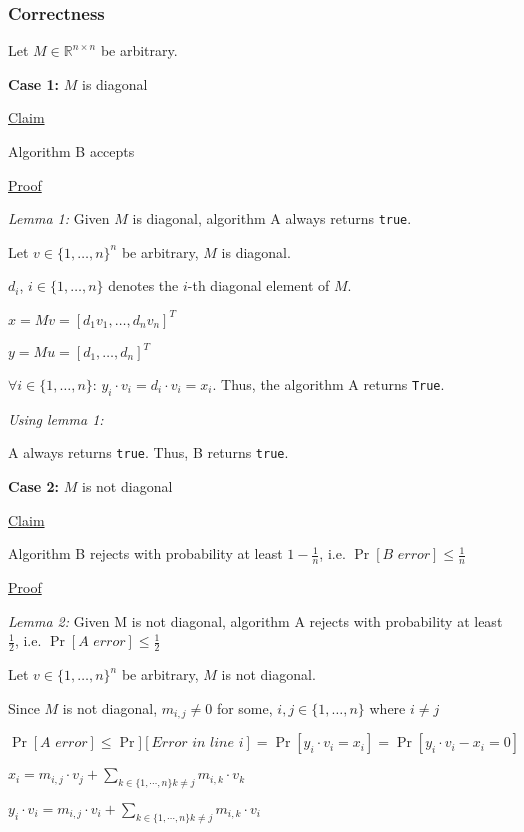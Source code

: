 \subsubsection*{Correctness}

Let $M  \in \mathbb{R}^{n \times n}$ be arbitrary.

\textbf{Case 1:} $M$ is diagonal

\underline{Claim} 

Algorithm B accepts

\underline{Proof}

\textit{Lemma 1:} Given $M$ is diagonal, algorithm A always returns \texttt{true}.

Let $v \in \{1,\dots,n\}^n$ be arbitrary, $M$ is diagonal.

$d_i$, $i \in \{1,\dots,n\}$ denotes the $i$-th diagonal element of $M$.

$x = Mv = [d_1 v_1,\dots, d_n v_n]^T$

$y = Mu = [d_1,\dots,d_n]^T$

$\forall i \in \{1,\dots,n\}$: $y_i \cdot v_i = d_i \cdot v_i = x_i$. Thus, the algorithm A returns \texttt{True}.

\textit{Using lemma 1:}

A always returns \texttt{true}. Thus, B returns \texttt{true}.

\textbf{Case 2:} $M$ is not diagonal

\underline{Claim} 

Algorithm B rejects with probability at least $1 - \frac{1}{n}$, i.e. $\operatorname{Pr}[\textit{B error}] \leq \frac{1}{n}$

\underline{Proof}

\textit{Lemma 2:} Given M is not diagonal, algorithm A rejects with probability at least $\frac{1}{2}$, i.e. $\operatorname{Pr}[\textit{A error}] \leq \frac{1}{2}$

Let $v \in \{1,\dots,n\}^n$ be arbitrary, $M$ is not diagonal.

Since $M$ is not diagonal, $m_{i,j} \neq 0$ for some, $i,j \in \{1,\dots,n\}$ where $i \neq j$

$\operatorname{Pr}[\textit{A error}] \leq
\operatorname{Pr}][\textit{Error in line i}] =
\operatorname{Pr}[y_i \cdot v_i = x_i] = 
\operatorname{Pr}[y_i \cdot v_i - x_i = 0]$

$x_i = m_{i,j} \cdot v_j + \sum_{k \in \{1,\cdots,n\} k \neq j} m_{i,k}\cdot v_k$

$y_i \cdot v_i = m_{i,j} \cdot v_i + \sum_{k \in \{1,\cdots,n\} k \neq j} m_{i,k}\cdot v_i$

